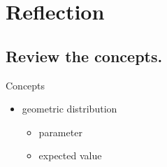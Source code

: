 \documentclass{beamer} %
\begin{document}
\setcounter{equation}{0}

\section{Reflection}

\subsection*{Review the concepts.}

\begin{frame}{Concepts}
  \begin{itemize}
    \item geometric distribution
    \begin{itemize}
      \item parameter
      \item expected value
    \end{itemize}
  \end{itemize}
\end{frame}
\end{document}
